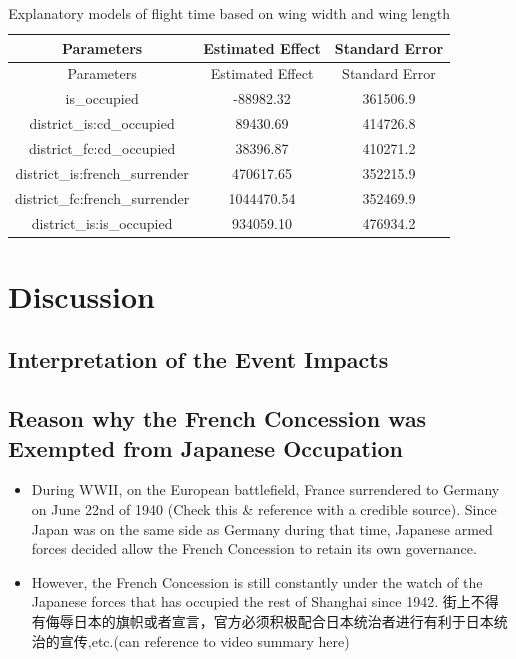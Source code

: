 \documentclass[
  letterpaper,
  DIV=11,
  numbers=noendperiod]{scrartcl}
\providecommand{\tightlist}{%
  \setlength{\itemsep}{0pt}\setlength{\parskip}{0pt}}\usepackage{longtable,booktabs,array}
\begin{document}
\hypertarget{tbl-events_district}{}
\begin{longtable}[]{@{}ccc@{}}
\caption{\label{tbl-events_district}Explanatory models of flight time
based on wing width and wing length}\tabularnewline
\toprule\noalign{}
Parameters & Estimated Effect & Standard Error \\
\midrule\noalign{}
\endfirsthead
\toprule\noalign{}
Parameters & Estimated Effect & Standard Error \\
\midrule\noalign{}
\endhead
\bottomrule\noalign{}
\endlastfoot
is\_occupied & -88982.32 & 361506.9 \\
district\_is:cd\_occupied & 89430.69 & 414726.8 \\
district\_fc:cd\_occupied & 38396.87 & 410271.2 \\
district\_is:french\_surrender & 470617.65 & 352215.9 \\
district\_fc:french\_surrender & 1044470.54 & 352469.9 \\
district\_is:is\_occupied & 934059.10 & 476934.2 \\
\end{longtable}

\hypertarget{discussion}{%
\section{Discussion}\label{discussion}}

\hypertarget{interpretation-of-the-event-impacts}{%
\subsection{Interpretation of the Event
Impacts}\label{interpretation-of-the-event-impacts}}

\hypertarget{reason-why-the-french-concession-was-exempted-from-japanese-occupation}{%
\subsection{Reason why the French Concession was Exempted from Japanese
Occupation}\label{reason-why-the-french-concession-was-exempted-from-japanese-occupation}}

\begin{itemize}
\tightlist
\item
  During WWII, on the European battlefield, France surrendered to
  Germany on June 22nd of 1940 (Check this \& reference with a credible
  source). Since Japan was on the same side as Germany during that time,
  Japanese armed forces decided allow the French Concession to retain
  its own governance.
\item
  However, the French Concession is still constantly under the watch of
  the Japanese forces that has occupied the rest of Shanghai since 1942.
  街上不得有侮辱日本的旗帜或者宣言，官方必须积极配合日本统治者进行有利于日本统治的宣传,etc.(can
  reference to video summary here)
\end{itemize}
\end{document}
